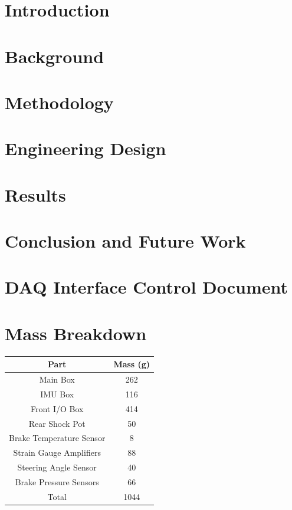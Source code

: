 \documentclass[12pt, notitlepage]{report}
\begin{document}
\chapter{Introduction}


\chapter{Background}


\chapter{Methodology}


\chapter{Engineering Design}


\chapter{Results}


\chapter{Conclusion and Future Work}



\appendix

\chapter{DAQ Interface Control Document}


\chapter{Mass Breakdown}
\begin{center}
\begin{tabular}{|c|c|}
    \hline
    Part & Mass (g) \\
    \hline
    Main Box & 262\\
    IMU Box & 116\\
    Front I/O Box & 414\\
    Rear Shock Pot & 50\\
    Brake Temperature Sensor & 8\\
    Strain Gauge Amplifiers & 88\\
    Steering Angle Sensor & 40\\
    Brake Pressure Sensors & 66 \\
    \hline
    \hline
    Total & 1044 \\
    \hline
\end{tabular}
\end{center}
\end{document}
